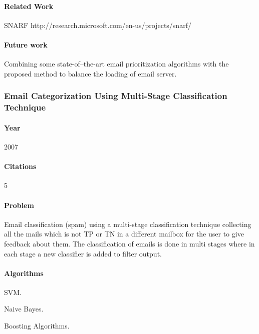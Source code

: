 \documentclass[12pt]{article}
\newenvironment{my_itemize}
{\begin{itemize}
  \setlength{\itemsep}{0cm}
  \setlength{\parskip}{0cm}}
{\end{itemize}}
\begin{document}
\paragraph{Related Work}
\begin{my_itemize}
  \item SNARF http://research.microsoft.com/en-us/projects/snarf/
\end{my_itemize}

\paragraph{Future work}
\begin{my_itemize}
  \item Combining some state-of–the-art email prioritization algorithms with the 
	proposed method to balance the loading of email server.
\end{my_itemize}


\subsubsection{Email Categorization Using Multi-Stage Classification Technique \cite{MD07}}

\paragraph{Year} 2007
\paragraph{Citations} 5

\paragraph{Problem}
\begin{my_itemize}
  \item Email classification (spam) using a multi-stage classification technique 
	collecting all the mails which is not TP or TN in a different mailbox for
	the user to give feedback about them. The classification of emails is done 
	in multi stages where in each stage a new classifier is added to filter output.
\end{my_itemize}

\paragraph{Algorithms}
\begin{my_itemize}
  \item SVM.
  \item Naive Bayes.
  \item Boosting Algorithms.
\end{my_itemize}
\end{document}
